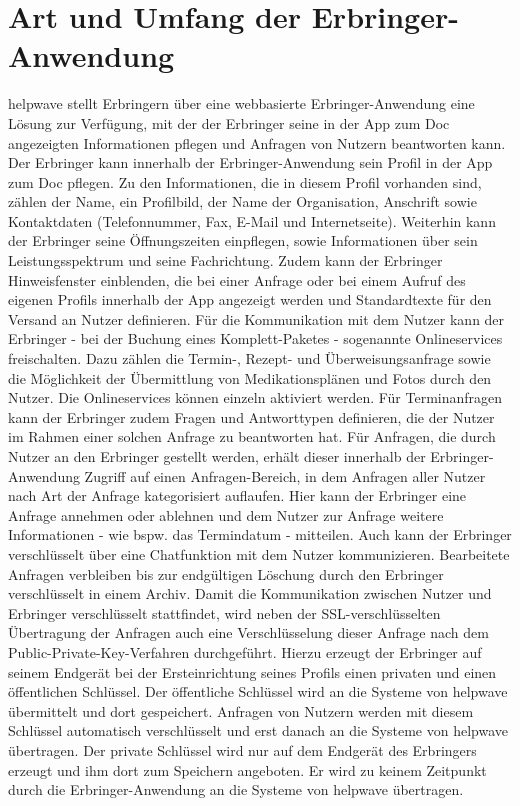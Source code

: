 \documentclass[10pt]{article}
\begin{document}
\section{Art und Umfang der Erbringer-Anwendung}
helpwave stellt Erbringern über eine webbasierte Erbringer-Anwendung eine Lösung zur Verfügung, mit der der Erbringer
seine in der App zum Doc angezeigten Informationen pflegen und Anfragen von Nutzern beantworten kann.
Der Erbringer kann innerhalb der Erbringer-Anwendung sein Profil in der App zum Doc pflegen. Zu den Informationen, die
in diesem Profil vorhanden sind, zählen der Name, ein Profilbild, der Name der Organisation, Anschrift sowie Kontaktdaten
(Telefonnummer, Fax, E-Mail und Internetseite). Weiterhin kann der Erbringer seine Öffnungszeiten einpflegen, sowie Informationen über sein Leistungsspektrum und seine Fachrichtung. Zudem kann der Erbringer Hinweisfenster einblenden, die
bei einer Anfrage oder bei einem Aufruf des eigenen Profils innerhalb der App angezeigt werden und Standardtexte für den
Versand an Nutzer definieren.
Für die Kommunikation mit dem Nutzer kann der Erbringer - bei der Buchung eines Komplett-Paketes - sogenannte Onlineservices freischalten. Dazu zählen die Termin-, Rezept- und Überweisungsanfrage sowie die Möglichkeit der Übermittlung
von Medikationsplänen und Fotos durch den Nutzer. Die Onlineservices können einzeln aktiviert werden. Für Terminanfragen
kann der Erbringer zudem Fragen und Antworttypen definieren, die der Nutzer im Rahmen einer solchen Anfrage zu beantworten hat.
Für Anfragen, die durch Nutzer an den Erbringer gestellt werden, erhält dieser innerhalb der Erbringer-Anwendung Zugriff
auf einen Anfragen-Bereich, in dem Anfragen aller Nutzer nach Art der Anfrage kategorisiert auflaufen. Hier kann der Erbringer eine Anfrage annehmen oder ablehnen und dem Nutzer zur Anfrage weitere Informationen - wie bspw. das Termindatum
- mitteilen. Auch kann der Erbringer verschlüsselt über eine Chatfunktion mit dem Nutzer kommunizieren. Bearbeitete Anfragen verbleiben bis zur endgültigen Löschung durch den Erbringer verschlüsselt in einem Archiv.
Damit die Kommunikation zwischen Nutzer und Erbringer verschlüsselt stattfindet, wird neben der SSL-verschlüsselten
Übertragung der Anfragen auch eine Verschlüsselung dieser Anfrage nach dem Public-Private-Key-Verfahren durchgeführt.
Hierzu erzeugt der Erbringer auf seinem Endgerät bei der Ersteinrichtung seines Profils einen privaten und einen öffentlichen Schlüssel. Der öffentliche Schlüssel wird an die Systeme von helpwave übermittelt und dort gespeichert. Anfragen von
Nutzern werden mit diesem Schlüssel automatisch verschlüsselt und erst danach an die Systeme von helpwave übertragen.
Der private Schlüssel wird nur auf dem Endgerät des Erbringers erzeugt und ihm dort zum Speichern angeboten. Er wird zu
keinem Zeitpunkt durch die Erbringer-Anwendung an die Systeme von helpwave übertragen.
\end{document}
